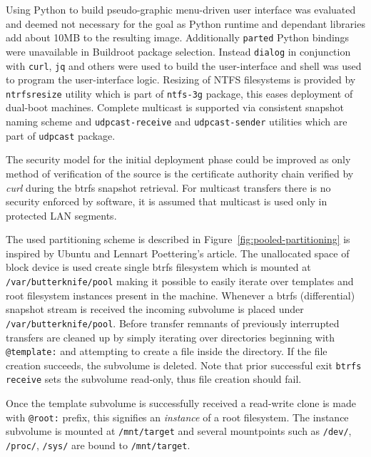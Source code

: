 \documentclass[a4paper,11pt]{kth-mag}
\begin{document}
Using Python to build pseudo-graphic menu-driven user interface was
evaluated and deemed not necessary for the goal as Python runtime and
dependant libraries add about 10MB to the resulting image.
Additionally \lstinline!parted! Python bindings were unavailable
in Buildroot package selection.
Instead \lstinline!dialog! in conjunction with
\lstinline!curl!, \lstinline!jq! and others were used to build the user-interface
and shell was used to program the user-interface logic.
Resizing of NTFS filesystems is provided by \lstinline!ntrfsresize! utility
which is part of \lstinline!ntfs-3g! package, this eases deployment of
dual-boot machines.
Complete multicast is supported via consistent snapshot naming scheme
and \lstinline!udpcast-receive! and \lstinline!udpcast-sender! utilities which
are part of \lstinline!udpcast! package.

The security model for the initial deployment phase could be improved
as only method of verification of the source is the certificate
authority chain verified by \emph{curl} during the \acrshort{btrfs} snapshot
retrieval. For multicast transfers there is no security
enforced by software, it is assumed that multicast is used only
in protected LAN segments.

The used partitioning scheme is described in Figure~\ref{fig:pooled-partitioning}
is inspired by Ubuntu and Lennart Poettering's article.
\cite{revisiting-how-we-put-together-linux-systems}
The unallocated space of block device is
used create single \acrshort{btrfs} filesystem
which is mounted at \lstinline!/var/butterknife/pool! making
it possible to easily iterate over templates and root filesystem instances
present in the machine.
Whenever a \acrshort{btrfs} (differential) snapshot stream is received
the incoming subvolume is placed under \lstinline!/var/butterknife/pool!.
Before transfer remnants of previously interrupted transfers are cleaned
up by simply iterating over directories beginning with \lstinline!@template:!
and attempting to create a file inside the directory.
If the file creation succeeds, the subvolume is deleted.
Note that prior successful exit \lstinline!btrfs receive! sets the
subvolume read-only, thus file creation should fail.

Once the template subvolume is successfully received
a read-write clone is made with \lstinline!@root:! prefix,
this signifies an \emph{instance} of a root filesystem.
The instance subvolume is mounted at \lstinline!/mnt/target!
and several mountpoints such as \lstinline!/dev/!,
\lstinline!/proc/!, \lstinline!/sys/! are bound to \lstinline!/mnt/target!.
\end{document}
